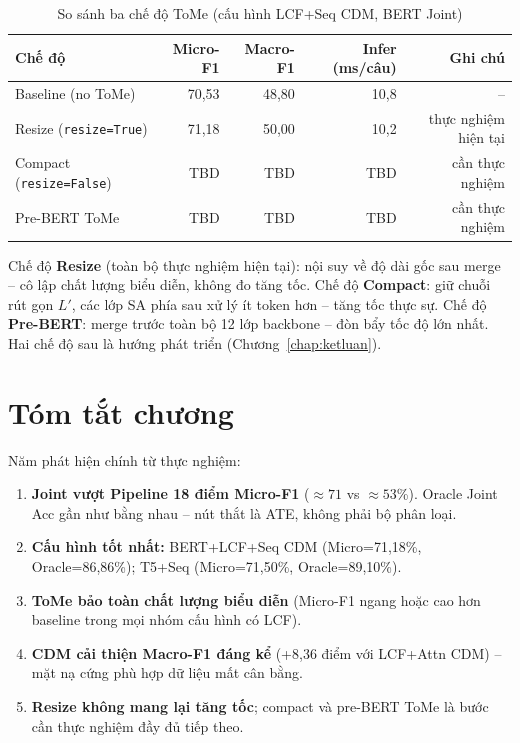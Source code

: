 \begin{table}[H]
\centering
\small
\caption{So sánh ba chế độ ToMe (cấu hình LCF+Seq CDM, BERT Joint)}
\label{tab:resize_compact}
\begin{tabular}{@{}lrrrr@{}}
\toprule
\textbf{Chế độ} & \textbf{Micro-F1} & \textbf{Macro-F1} & \textbf{Infer (ms/câu)} & \textbf{Ghi chú} \\
\midrule
Baseline (no ToMe)       & 70,53 & 48,80 & 10,8 & -- \\
Resize (\texttt{resize=True})   & 71,18 & 50,00 & 10,2 & thực nghiệm hiện tại \\
Compact (\texttt{resize=False}) & TBD   & TBD   & TBD  & cần thực nghiệm \\
Pre-BERT ToMe            & TBD   & TBD   & TBD  & cần thực nghiệm \\
\bottomrule
\end{tabular}
\end{table}

Chế độ \textbf{Resize} (toàn bộ thực nghiệm hiện tại): nội suy về độ
dài gốc sau merge -- cô lập chất lượng biểu diễn, không đo tăng tốc.
Chế độ \textbf{Compact}: giữ chuỗi rút gọn $L'$, các lớp SA phía sau
xử lý ít token hơn -- tăng tốc thực sự. Chế độ \textbf{Pre-BERT}: merge
trước toàn bộ 12 lớp backbone -- đòn bẩy tốc độ lớn nhất. Hai chế độ
sau là hướng phát triển (Chương~\ref{chap:ketluan}).

\section*{Tóm tắt chương}

Năm phát hiện chính từ thực nghiệm:

\begin{enumerate}
  \item \textbf{Joint vượt Pipeline 18 điểm Micro-F1} ($\approx71$ vs
        $\approx53$\%). Oracle Joint Acc gần như bằng nhau -- nút thắt
        là ATE, không phải bộ phân loại.
  \item \textbf{Cấu hình tốt nhất:} BERT+LCF+Seq CDM (Micro=71,18\%,
        Oracle=86,86\%); T5+Seq (Micro=71,50\%, Oracle=89,10\%).
  \item \textbf{ToMe bảo toàn chất lượng biểu diễn} (Micro-F1 ngang hoặc
        cao hơn baseline trong mọi nhóm cấu hình có LCF).
  \item \textbf{CDM cải thiện Macro-F1 đáng kể} (+8,36 điểm với
        LCF+Attn CDM) -- mặt nạ cứng phù hợp dữ liệu mất cân bằng.
  \item \textbf{Resize không mang lại tăng tốc}; compact và pre-BERT ToMe
        là bước cần thực nghiệm đầy đủ tiếp theo.
\end{enumerate}

